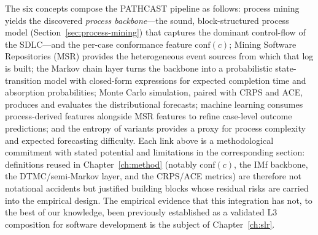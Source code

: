 The six concepts compose the PATHCAST pipeline as follows: process
mining yields the discovered \emph{process backbone}---the sound,
block-structured process model (Section~\ref{sec:process-mining}) that
captures the dominant control-flow of the SDLC---and the per-case
conformance feature $\text{conf}(c)$;
Mining Software Repositories (MSR) provides the heterogeneous event sources
from which that log is built; the Markov chain layer turns the backbone
into a probabilistic state-transition model with closed-form expressions
for expected completion time and absorption probabilities; Monte Carlo
simulation, paired with CRPS and ACE, produces and evaluates the
distributional forecasts; machine learning consumes process-derived
features alongside MSR features to refine case-level outcome predictions;
and the entropy of variants provides a proxy for process complexity and
expected forecasting difficulty.
Each link above is a methodological commitment with stated potential and
limitations in the corresponding section: definitions reused in
Chapter~\ref{ch:method} (notably $\text{conf}(c)$, the IMf backbone, the
DTMC/semi-Markov layer, and the CRPS/ACE metrics) are therefore not
notational accidents but justified building blocks whose residual risks are
carried into the empirical design.
The empirical evidence that this integration has not, to the best of our
knowledge, been previously established as a validated L3 composition for
software development is the subject of Chapter~\ref{ch:slr}.
